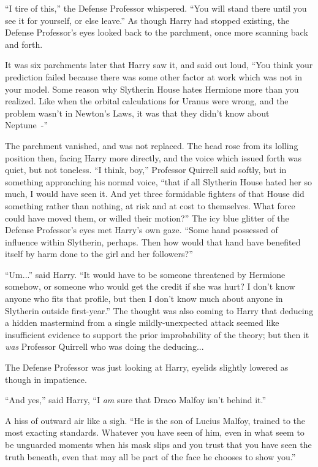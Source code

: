 ``I tire of this,'' the Defense Professor whispered. ``You will stand there until you see it for yourself, or else leave.'' As though Harry had stopped existing, the Defense Professor's eyes looked back to the parchment, once more scanning back and forth.

It was six parchments later that Harry saw it, and said out loud, ``You think your prediction failed because there was some other factor at work which was not in your model. Some reason why Slytherin House hates Hermione more than you realized. Like when the orbital calculations for Uranus were wrong, and the problem wasn't in Newton's Laws, it was that they didn't know about Neptune~-''

The parchment vanished, and was not replaced. The head rose from its lolling position then, facing Harry more directly, and the voice which issued forth was quiet, but not toneless. ``I think, boy,'' Professor Quirrell said softly, but in something approaching his normal voice, ``that if all Slytherin House hated her so much, I would have seen it. And yet three formidable fighters of that House did something rather than nothing, at risk and at cost to themselves. What force could have moved them, or willed their motion?'' The icy blue glitter of the Defense Professor's eyes met Harry's own gaze. ``Some hand possessed of influence within Slytherin, perhaps. Then how would that hand have benefited itself by harm done to the girl and her followers?''

``Um...'' said Harry. ``It would have to be someone threatened by Hermione somehow, or someone who would get the credit if she was hurt? I don't know anyone who fits that profile, but then I don't know much about anyone in Slytherin outside first-year.'' The thought was also coming to Harry that deducing a hidden mastermind from a single mildly-unexpected attack seemed like insufficient evidence to support the prior improbability of the theory; but then it \emph{was} Professor Quirrell who was doing the deducing...

The Defense Professor was just looking at Harry, eyelids slightly lowered as though in impatience.

``And yes,'' said Harry, ``I \emph{am} sure that Draco Malfoy isn't behind it.''

A hiss of outward air like a sigh. ``He is the son of Lucius Malfoy, trained to the most exacting standards. Whatever you have seen of him, even in what seem to be unguarded moments when his mask slips and you trust that you have seen the truth beneath, even that may all be part of the face he chooses to show you.''

